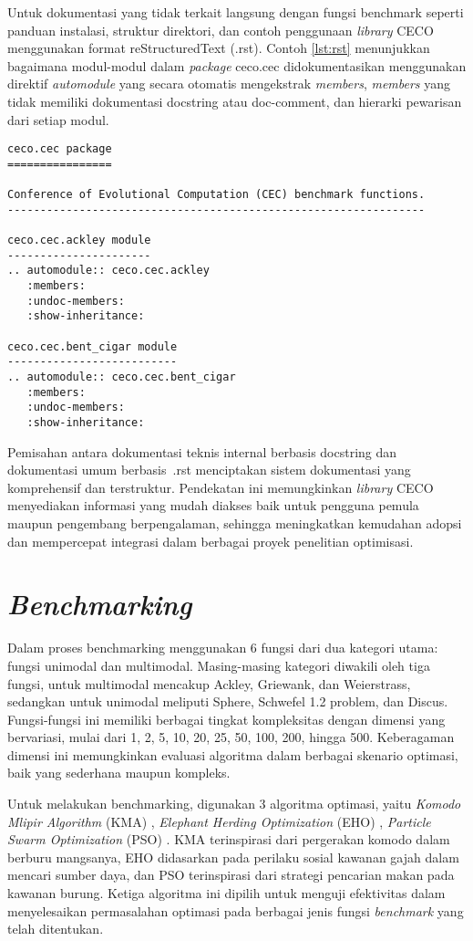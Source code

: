 Untuk dokumentasi yang tidak terkait langsung dengan fungsi benchmark seperti panduan instalasi, struktur direktori, dan contoh penggunaan \textit{library} CECO menggunakan format reStructuredText (.rst). Contoh \cref{lst:rst} menunjukkan bagaimana modul-modul dalam \textit{package} ceco.cec didokumentasikan menggunakan direktif \textit{automodule} yang secara otomatis mengekstrak \textit{members}, \textit{members} yang tidak memiliki dokumentasi docstring atau doc-comment, dan hierarki pewarisan dari setiap modul.
\begin{lstlisting}[caption=Dokumentasi dengan \textit{reStructuredText}, label=lst:rst]
ceco.cec package
================

Conference of Evolutional Computation (CEC) benchmark functions.
----------------------------------------------------------------

ceco.cec.ackley module
----------------------
.. automodule:: ceco.cec.ackley
   :members:
   :undoc-members:
   :show-inheritance:

ceco.cec.bent_cigar module
--------------------------
.. automodule:: ceco.cec.bent_cigar
   :members:
   :undoc-members:
   :show-inheritance:
\end{lstlisting}
Pemisahan antara dokumentasi teknis internal berbasis docstring dan dokumentasi umum berbasis\ .rst menciptakan sistem dokumentasi yang komprehensif dan terstruktur. Pendekatan ini memungkinkan \textit{library} CECO menyediakan informasi yang mudah diakses baik untuk pengguna pemula maupun pengembang berpengalaman, sehingga meningkatkan kemudahan adopsi dan mempercepat integrasi dalam berbagai proyek penelitian optimisasi.

\section{\textit{Benchmarking}}
Dalam proses benchmarking menggunakan 6 fungsi dari dua kategori utama: fungsi unimodal dan multimodal. Masing-masing kategori diwakili oleh tiga fungsi, untuk multimodal mencakup Ackley, Griewank, dan Weierstrass, sedangkan untuk unimodal meliputi Sphere, Schwefel 1.2 problem, dan Discus. Fungsi-fungsi ini memiliki berbagai tingkat kompleksitas dengan dimensi yang bervariasi, mulai dari 1, 2, 5, 10, 20, 25, 50, 100, 200, hingga 500. Keberagaman dimensi ini memungkinkan evaluasi algoritma dalam berbagai skenario optimasi, baik yang sederhana maupun kompleks.

Untuk melakukan benchmarking, digunakan 3 algoritma optimasi, yaitu \textit{Komodo Mlipir Algorithm} (KMA) \citep{Suyanto_2022}, \textit{Elephant Herding Optimization} (EHO) \citep{Wang_2015}, \textit{Particle Swarm Optimization} (PSO) \citep{Kennedy_1995}. KMA terinspirasi dari pergerakan komodo dalam berburu mangsanya, EHO didasarkan pada perilaku sosial kawanan gajah dalam mencari sumber daya, dan PSO terinspirasi dari strategi pencarian makan pada kawanan burung. Ketiga algoritma ini dipilih untuk menguji efektivitas dalam menyelesaikan permasalahan optimasi pada berbagai jenis fungsi \textit{benchmark} yang telah ditentukan.

